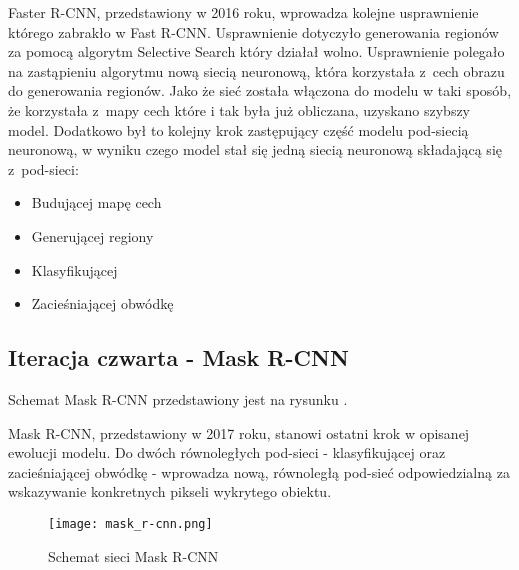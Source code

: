 
Faster R-CNN, przedstawiony w 2016 roku, wprowadza kolejne usprawnienie którego zabrakło w Fast R-CNN.
Usprawnienie dotyczyło generowania regionów za pomocą algorytm Selective Search który działał wolno.
Usprawnienie polegało na zastąpieniu algorytmu nową siecią neuronową, która korzystała z~cech obrazu do generowania regionów.
Jako że sieć została włączona do modelu w taki sposób, że korzystała z~mapy cech które i tak była już obliczana, uzyskano szybszy model.
Dodatkowo był to kolejny krok zastępujący część modelu pod-siecią neuronową, w wyniku czego model stał się jedną siecią neuronową składającą się z~pod-sieci:

\begin{itemize}
	\item Budującej mapę cech
	\item Generującej regiony
	\item Klasyfikującej
	\item Zacieśniającej obwódkę
\end{itemize}

\subsection{Iteracja czwarta - Mask R-CNN}

Schemat Mask R-CNN przedstawiony jest na rysunku .


Mask R-CNN, przedstawiony w 2017 roku, stanowi ostatni krok w opisanej ewolucji modelu.
Do dwóch równoległych pod-sieci - klasyfikującej oraz zacieśniającej obwódkę - wprowadza nową, równoległą pod-sieć odpowiedzialną za wskazywanie konkretnych pikseli wykrytego obiektu.

\begin{figure}[h]
  \centering
  \caption{Schemat sieci Mask R-CNN}
  \texttt{[image: mask\_r-cnn.png]}
  \label{fig:mask_r_cnn}
\end{figure}
